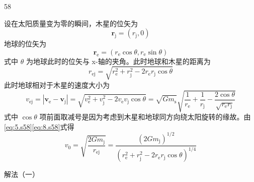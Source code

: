 \begin{solution}{58}
\begin{subsolution}
        设在太阳质量变为零的瞬间，木星的位矢为
        \begin{equation}
            \boldsymbol{r} _ {\mathrm{j}} = (r _ {\mathrm{j}}, 0)
            \label{eq:6.s58}
        \end{equation}
        地球的位矢为
        \begin{equation}
            \boldsymbol{r} _ {\mathrm{e}} = \left(r _ {\mathrm{e}} \cos \theta , r _ {\mathrm{e}} \sin \theta\right)
            \label{eq:7.s58}
        \end{equation}
        式中 $\theta$ 为地球此时的位矢与 x-轴的夹角。此时地球和木星的距离为
        \begin{equation}
            r _ {\mathrm{ej}} = \sqrt {r _ {\mathrm{e}}^{2} + r _ {\mathrm{j}}^{2} - 2 r _ {\mathrm{e}} r _ {\mathrm{j}} \cos \theta}
            \label{eq:8.s58}
        \end{equation}
        此时地球相对于木星的速度大小为
        \begin{equation}
            v _ {\mathrm{ej}} = \left| \boldsymbol{v} _ {\mathrm{e}} - \boldsymbol{v} _ {\mathrm{j}} \right| = \sqrt {v _ {\mathrm{e}}^{2} + v _ {\mathrm{j}}^{2} - 2 v _ {\mathrm{e}} v _ {\mathrm{j}} \cos \theta} = \sqrt {G m _ {\mathrm{s}}} \sqrt {\frac {1}{r _ {\mathrm{e}}} + \frac {1}{r _ {\mathrm{j}}} - \frac {2 \cos \theta}{\sqrt {r _ {\mathrm{e}} r _ {\mathrm{j}}}}}
            \label{eq:9.s58}
        \end{equation}
        式中 $\cos \theta$ 项前面取减号是因为考虑到木星和地球同方向绕太阳旋转的缘故。由\eqref{eq:5.s58}\eqref{eq:8.s58}式得
        \begin{equation}
            v _ {0} = \sqrt {\frac {2 G m _ {\mathrm{j}}}{r _ {\mathrm{ej}}}} = \frac {(2 G m _ {\mathrm{j}})^{1 / 2}}{(r _ {\mathrm{e}}^{2} + r _ {\mathrm{j}}^{2} - 2 r _ {\mathrm{e}} r _ {\mathrm{j}} \cos \theta)^{1 / 4}}
            \label{eq:10.s58}
        \end{equation}
    \end{subsolution}
    \begin{subsolution}
        解法（一）


\end{subsolution}
\end{solution}
